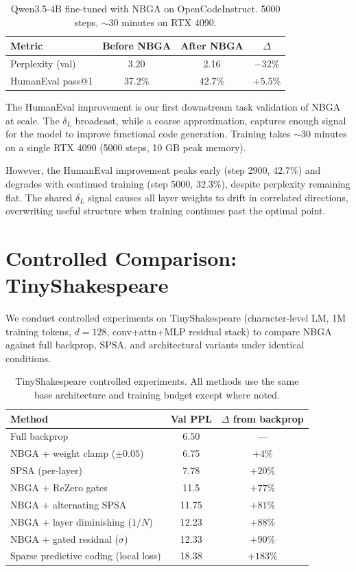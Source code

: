 \documentclass[11pt]{article}
\begin{document}
\begin{table}[h]
\centering
\begin{tabular}{lccc}
\toprule
Metric & Before NBGA & After NBGA & $\Delta$ \\
\midrule
Perplexity (val) & 3.20 & 2.16 & $-32\%$ \\
HumanEval pass@1 & 37.2\% & 42.7\% & $+5.5\%$ \\
\bottomrule
\end{tabular}
\caption{Qwen3.5-4B fine-tuned with NBGA on OpenCodeInstruct. 5000 steps, $\sim$30 minutes on RTX 4090.}
\end{table}

The HumanEval improvement is our first downstream task validation of NBGA at scale. The $\delta_L$ broadcast, while a coarse approximation, captures enough signal for the model to improve functional code generation. Training takes $\sim$30 minutes on a single RTX 4090 (5000 steps, 10 GB peak memory).

However, the HumanEval improvement peaks early (step 2900, 42.7\%) and degrades with continued training (step 5000, 32.3\%), despite perplexity remaining flat. The shared $\delta_L$ signal causes all layer weights to drift in correlated directions, overwriting useful structure when training continues past the optimal point.

\section{Controlled Comparison: TinyShakespeare}

We conduct controlled experiments on TinyShakespeare (character-level LM, 1M training tokens, $d=128$, conv+attn+MLP residual stack) to compare NBGA against full backprop, SPSA, and architectural variants under identical conditions.

\begin{table}[h]
\centering
\begin{tabular}{lcc}
\toprule
Method & Val PPL & $\Delta$ from backprop \\
\midrule
Full backprop & 6.50 & --- \\
NBGA + weight clamp ($\pm0.05$) & 6.75 & $+4\%$ \\
SPSA (per-layer) & 7.78 & $+20\%$ \\
NBGA + ReZero gates & 11.5 & $+77\%$ \\
NBGA + alternating SPSA & 11.75 & $+81\%$ \\
NBGA + layer diminishing ($1/N$) & 12.23 & $+88\%$ \\
NBGA + gated residual ($\sigma$) & 12.33 & $+90\%$ \\
Sparse predictive coding (local loss) & 18.38 & $+183\%$ \\
\bottomrule
\end{tabular}
\caption{TinyShakespeare controlled experiments. All methods use the same base architecture and training budget except where noted.}
\end{table}
\end{document}
